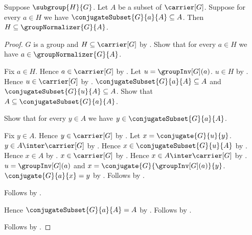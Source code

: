 \begin{theorem}\label{subgroup_subseteq_group_normalizer_of_conjugate_subseteq}
    Suppose $\subgroup{H}{G}$.
    Let $A$ be a subset of $\carrier[G]$.
    Suppose for every $a\in H$ we have
        $\conjugateSubset{G}{a}{A}\subseteq A$.
    Then $H\subseteq\groupNormalizer{G}{A}$.
\end{theorem}
\begin{proof}
    $G$ is a group and $H\subseteq\carrier[G]$ by
        .
    Show that for every $a\in H$ we have
        $a\in\groupNormalizer{G}{A}$.
    \begin{subproof}
        Fix $a\in H$.
        Hence $a\in\carrier[G]$ by .
        Let $u=\groupInv[G](a)$.
        $u\in H$ by .
        Hence $u\in\carrier[G]$ by .
        $\conjugateSubset{G}{a}{A}\subseteq A$ and
            $\conjugateSubset{G}{u}{A}\subseteq A$.
        Show that $A\subseteq\conjugateSubset{G}{a}{A}$.
        \begin{subproof}
            Show that for every $y\in A$ we have
                $y\in\conjugateSubset{G}{a}{A}$.
            \begin{subproof}
                Fix $y\in A$.
                Hence $y\in\carrier[G]$ by .
                Let $x=\conjugate{G}{u}{y}$.
                $y\in A\inter\carrier[G]$ by .
                Hence $x\in\conjugateSubset{G}{u}{A}$ by
                    .
                Hence $x\in A$ by .
                $x\in\carrier[G]$ by
                    .
                Hence $x\in A\inter\carrier[G]$ by
                    .
                $u=\groupInv[G](a)$ and
                    $x=\conjugate{G}{\groupInv[G](a)}{y}$.
                $\conjugate{G}{a}{x}=y$ by
                    .
                Follows by .
            \end{subproof}
            Follows by .
        \end{subproof}
        Hence $\conjugateSubset{G}{a}{A}=A$ by
            .
        Follows by .
    \end{subproof}
    Follows by .
\end{proof}

